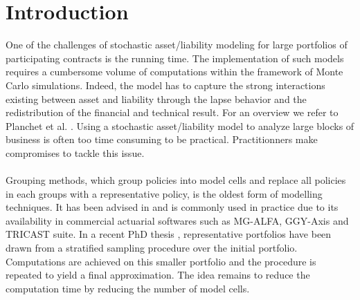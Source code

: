 \section{Introduction}
One of the challenges of stochastic asset/liability modeling for large portfolios of participating contracts is the running time. The implementation of such models requires a cumbersome volume of computations within the framework of Monte Carlo simulations. Indeed, the model has to capture the strong interactions existing between asset and liability through the lapse behavior and the redistribution of the financial and technical result. For an overview we refer to Planchet et al. \citet{PlThJu11}. Using a stochastic asset/liability model to analyze large blocks of business is often too time consuming to be practical. Practitionners make compromises to tackle this issue.\\
\\
Grouping methods, which group policies into model cells and replace all policies in each groups with a representative policy, is the oldest form of modelling techniques. It has been advised in \citet{EIOPA} and is commonly used in practice due to its availability in commercial actuarial softwares such as MG-ALFA, GGY-Axis and TRICAST suite. In a recent PhD thesis \citet{Sa13}, representative portfolios have been drawn from a stratified sampling procedure over the initial portfolio. Computations are achieved on this smaller portfolio and the procedure is repeated to yield a final approximation. The idea  remains to reduce the computation time by reducing the number of model cells.\\
\\
